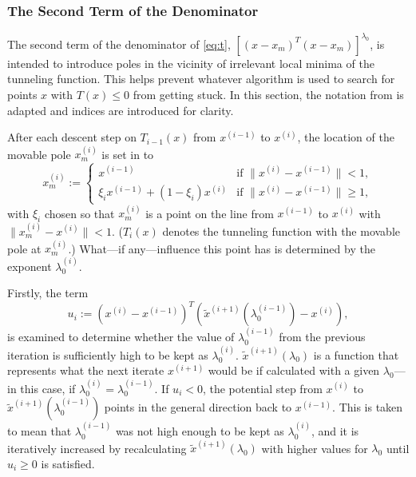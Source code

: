 \documentclass[a4paper,12pt,twoside]{article}
\begin{document}
\subsubsection{The Second Term of the Denominator}


The second term of the denominator of \eqref{eq:t}, $[(x-x_m)^T(x-x_m)]^{\lambda_0}$, is intended to introduce poles in the vicinity of irrelevant local minima of the tunneling function. This helps prevent whatever algorithm is used to search for points $x$ with $T(x) \leq 0$ from getting stuck. In this section, the notation from \cite{levy_tunneling_1985} is adapted and indices are introduced for clarity.

After each descent step on $T_{i-1}(x)$ from $x^{(i-1)}$ to $x^{(i)}$, the location of the movable pole $x_m^{(i)}$ is set in \cite[Eq. A.7]{levy_tunneling_1985} to 
\begin{equation}\label{eq:xm}
    x_m^{(i)}:=\begin{cases}
        x^{(i-1)} & \text{if } \|x^{(i)}-x^{(i-1)}\| < 1, \\ 
        \xi_i x^{(i-1)} + (1-\xi_i)x^{(i)} & \text{if } \|x^{(i)}-x^{(i-1)}\| \geq 1,
    \end{cases}
\end{equation}
with $\xi_i$ chosen so that $x_m^{(i)}$ is a point on the line from $x^{(i-1)}$ to $x^{(i)}$ with $\|x_m^{(i)} - x^{(i)}\| < 1$. ($T_i(x)$ denotes the tunneling function with the movable pole at $x_m^{(i)}$.) What—if any—influence this point has is determined by the exponent $\lambda_0^{(i)}$. 

Firstly, the term \cite[Eq. A.8]{levy_tunneling_1985}
\begin{equation}
u_i := (x^{(i)}-x^{(i-1)})^T(\tilde x^{(i+1)}(\lambda_0^{(i-1)}) - x^{(i)}),
\end{equation}
is examined to determine whether the value of $\lambda_0^{(i-1)}$ from the previous iteration is sufficiently high to be kept as $\lambda_0^{(i)}$. $\tilde x^{(i+1)}(\lambda_0)$ is a function that represents what the next iterate $x^{(i+1)}$ would be if calculated with a given $\lambda_0$—in this case, if $\lambda_0^{(i)} = \lambda_0^{(i-1)}$. If $u_i<0$, the potential step from $x^{(i)}$ to $\tilde x^{(i+1)}(\lambda_0^{(i-1)})$ points in the general direction back to $x^{(i-1)}$. This is taken to mean that $\lambda_0^{(i-1)}$ was not high enough to be kept as $\lambda_0^{(i)}$, and it is iteratively increased by recalculating $\tilde x^{(i+1)}(\lambda_0)$ with higher values for $\lambda_0$ until $u_i \geq 0$ is satisfied.
\end{document}
